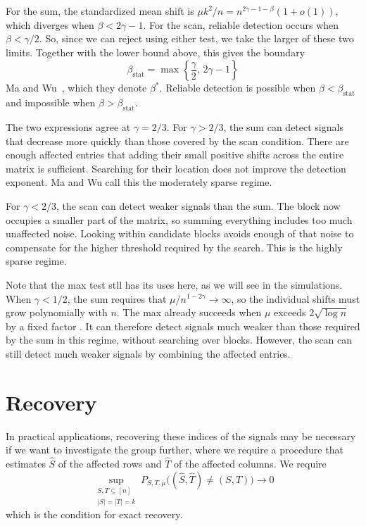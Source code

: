\documentclass[12pt]{article}
\begin{document}
For the sum, the standardized mean shift is
$\mu k^2/n=n^{2\gamma-1-\beta}(1+o(1))$, which diverges when
$\beta<2\gamma-1$. For the scan, reliable detection occurs when $\beta<\gamma/2$.
So, since we can reject using either test, we take the larger
of these two limits. Together with the lower bound above, this gives the boundary
\[
\beta_{\mathrm{stat}}
=\max\left\{\frac{\gamma}{2},\,2\gamma-1\right\}
\]
Ma and Wu~\cite[Section 1.2]{MW2015}, which they denote $\beta^*$. Reliable detection is possible when $\beta<\beta_{\mathrm{stat}}$
and impossible when $\beta>\beta_{\mathrm{stat}}$.

The two expressions agree at $\gamma=2/3$. For $\gamma>2/3$,
the sum can detect signals that decrease more quickly than those
covered by the scan condition. There are enough affected entries
that adding their small positive shifts across the entire matrix
is sufficient. Searching for their location does not improve the
detection exponent. Ma and Wu call this the moderately sparse regime.

For $\gamma<2/3$, the scan can detect weaker signals than the sum.
The block now occupies a smaller part of the matrix, so summing
everything includes too much unaffected noise. Looking within
candidate blocks avoids enough of that noise to compensate for the
higher threshold required by the search. This is the highly sparse
regime.

Note that the max test stll has its uses here, as we will see in the simulations. When $\gamma<1/2$,
the sum requires that $\mu/n^{1-2\gamma}\to\infty$, so the individual
shifts must grow polynomially with $n$. The max already succeeds
when $\mu$ exceeds $2\sqrt{\log n}$ by a fixed factor
\cite[Theorem 2, condition (17)]{MW2015}. It can therefore detect
signals much weaker than those required by the sum in this regime,
without searching over blocks. However, the scan can still detect much
weaker signals by combining the affected entries.

\section{Recovery}\label{sec:recovery}

In practical applications, recovering these indices of the signals may
be necessary if we want to investigate the group further, where we require a 
procedure that estimates $\widehat S$ of the affected rows and
$\widehat T$ of the affected columns. We require
\[
\sup_{\substack{S,T\subseteq[n]\\|S|=|T|=k}}
P_{S,T,\mu}\bigl((\widehat S,\widehat T)\ne(S,T)\bigr)
\longrightarrow0
\]
which is the condition for exact recovery.
\end{document}
